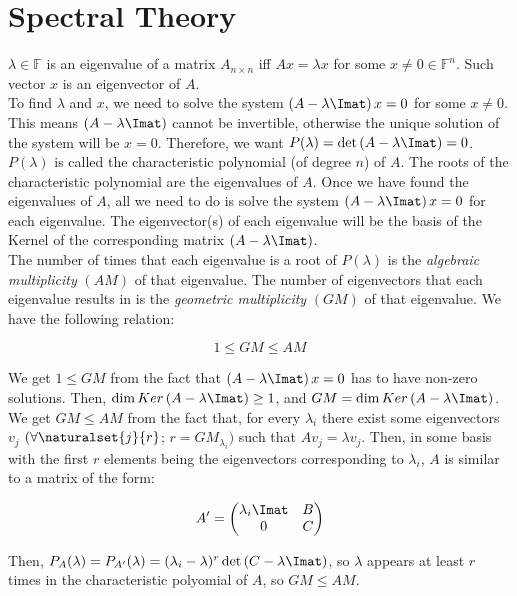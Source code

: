 \section*{Spectral Theory}

$\lambda \in \mathbb{F}$ is an eigenvalue of a matrix $A_{n\times n}$ iff $Ax=\lambda x$ for some $x\neq 0\in \mathbb{F}^n$. Such vector $x$ is an eigenvector of $A$.\\

To find $\lambda$ and $x$, we need to solve the system $\left(A-\lambda\Imat\right)x=0$ for some $x\neq 0$. This means $\left(A-\lambda\Imat\right)$ cannot be invertible, otherwise the unique solution of the system will be $x=0$. Therefore, we want $P(\lambda)=\det \left(A-\lambda\Imat\right)=0$. $P(\lambda)$ is called the characteristic polynomial (of degree $n$) of $A$. The roots of the characteristic polynomial are the eigenvalues of $A$. Once we have found the eigenvalues of $A$, all we need to do is solve the system $\left(A-\lambda\Imat\right)x=0$ for each eigenvalue. The eigenvector(s) of each eigenvalue will be the basis of the Kernel of the corresponding matrix $\left(A-\lambda\Imat\right)$.\\

The number of times that each eigenvalue is a root of $P(\lambda)$ is the \textit{algebraic multiplicity} $(AM)$ of that eigenvalue. The number of eigenvectors that each eigenvalue results in is the \textit{geometric multiplicity} $(GM)$ of that eigenvalue. We have the following relation:

$$1\leq GM\leq AM$$

We get $1\leq GM$ from the fact that $\left(A-\lambda\Imat\right)x=0$ has to have non-zero solutions. Then, $\dim Ker\left(A-\lambda \Imat\right) \geq 1$, and $GM=\dim  Ker\left(A-\lambda\Imat\right)$.\\

We get $GM\leq AM$ from the fact that, for every $\lambda_i$ there exist some eigenvectors $v_j$ $(\forall \naturalset{j}{r}$; $r=GM_{\lambda_i})$ such that $Av_j=\lambda v_j$. Then, in some basis with the first $r$ elements being the eigenvectors corresponding to $\lambda_i$, $A$ is similar to a matrix of the form:

$$A'=\begin{pmatrix}\lambda_i \Imat & B \\ 0 & C\\ \end{pmatrix}$$

Then, $P_{A}(\lambda)=P_{A'}(\lambda)=(\lambda_i-\lambda)^r\det \left(C-\lambda\Imat\right)$, so $\lambda$ appears at least $r$ times in the characteristic polyomial of $A$, so $GM \leq AM$.\\

